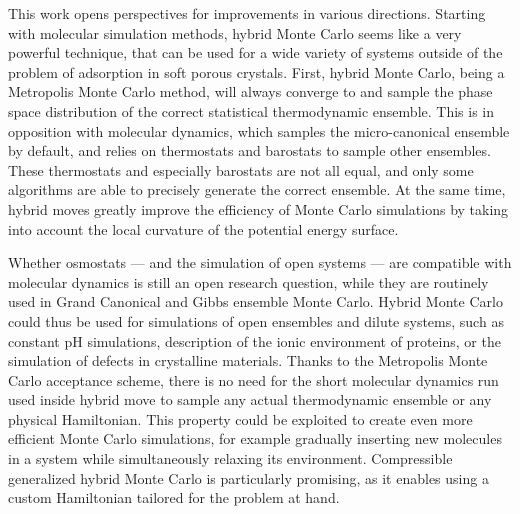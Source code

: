 This work opens perspectives for improvements in various directions. Starting
with molecular simulation methods, hybrid Monte Carlo seems like a very powerful
technique, that can be used for a wide variety of systems outside of the problem
of adsorption in soft porous crystals. First, hybrid Monte Carlo, being a
Metropolis Monte Carlo method, will always converge to and sample the phase
space distribution of the correct statistical thermodynamic ensemble. This is in
opposition with molecular dynamics, which samples the micro-canonical ensemble
by default, and relies on thermostats and barostats to sample other ensembles.
These thermostats and especially barostats are not all equal, and only some
algorithms are able to precisely generate the correct ensemble. At the same
time, hybrid moves greatly improve the efficiency of Monte Carlo simulations by
taking into account the local curvature of the potential energy surface.

Whether osmostats --- and the simulation of open systems --- are compatible with
molecular dynamics is still an open research question, while they are routinely
used in Grand Canonical and Gibbs ensemble Monte Carlo. Hybrid Monte Carlo could
thus be used for simulations of open ensembles and dilute systems, such as
constant pH simulations, description of the ionic environment of proteins, or
the simulation of defects in crystalline materials. Thanks to the Metropolis
Monte Carlo acceptance scheme, there is no need for the short molecular dynamics
run used inside hybrid move to sample any actual thermodynamic ensemble or any
physical Hamiltonian. This property could be exploited to create even more
efficient Monte Carlo simulations, for example gradually inserting new molecules
in a system while simultaneously relaxing its environment. Compressible
generalized hybrid Monte Carlo is particularly promising, as it enables using a
custom Hamiltonian tailored for the problem at hand.

